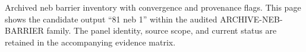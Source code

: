 Archived neb barrier inventory with convergence and provenance flags. This page shows the candidate output ``81 neb 1'' within the audited ARCHIVE-NEB-BARRIER family. The panel identity, source scope, and current status are retained in the accompanying evidence matrix.
